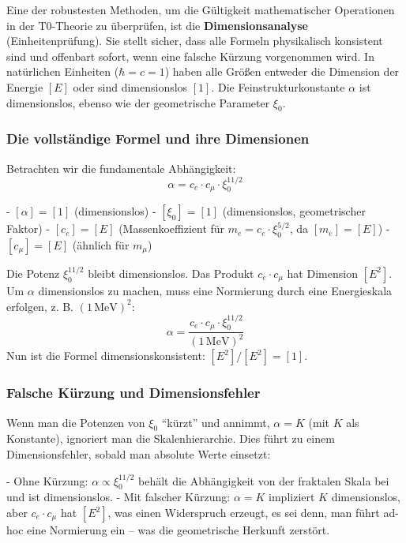 \documentclass[12pt,a4paper]{article}
\newcommand{\xipar}{\xi_0}
\begin{document}
	Eine der robustesten Methoden, um die Gültigkeit mathematischer Operationen in der T0-Theorie zu überprüfen, ist die \textbf{Dimensionsanalyse} (Einheitenprüfung). Sie stellt sicher, dass alle Formeln physikalisch konsistent sind und offenbart sofort, wenn eine falsche Kürzung vorgenommen wird. In natürlichen Einheiten ($\hbar = c = 1$) haben alle Größen entweder die Dimension der Energie $[E]$ oder sind dimensionslos $[1]$. Die Feinstrukturkonstante $\alpha$ ist dimensionslos, ebenso wie der geometrische Parameter $\xipar$.
	
	\subsubsection{Die vollständige Formel und ihre Dimensionen}
	
	Betrachten wir die fundamentale Abhängigkeit:
	\begin{equation}
		\alpha = c_e \cdot c_\mu \cdot \xipar^{11/2}
		\label{eq:full_with_dims}
	\end{equation}
	
	- $[\alpha] = [1]$ (dimensionslos)
	- $[\xipar] = [1]$ (dimensionslos, geometrischer Faktor)
	- $[c_e] = [E]$ (Massenkoeffizient für $m_e = c_e \cdot \xipar^{5/2}$, da $[m_e] = [E]$)
	- $[c_\mu] = [E]$ (ähnlich für $m_\mu$)
	
	Die Potenz $\xipar^{11/2}$ bleibt dimensionslos. Das Produkt $c_e \cdot c_\mu$ hat Dimension $[E^2]$. Um $\alpha$ dimensionslos zu machen, muss eine Normierung durch eine Energieskala erfolgen, z. B. $(1\,\text{MeV})^2$:
	\begin{equation}
		\alpha = \frac{c_e \cdot c_\mu \cdot \xipar^{11/2}}{(1\,\text{MeV})^2}
	\end{equation}
	Nun ist die Formel dimensionskonsistent: $[E^2] / [E^2] = [1]$.
	
	\subsubsection{Falsche Kürzung und Dimensionsfehler}
	
	Wenn man die Potenzen von $\xipar$ ``kürzt'' und annimmt, $\alpha = K$ (mit $K$ als Konstante), ignoriert man die Skalenhierarchie. Dies führt zu einem Dimensionsfehler, sobald man absolute Werte einsetzt:
	
	- Ohne Kürzung: $\alpha \propto \xipar^{11/2}$ behält die Abhängigkeit von der fraktalen Skala bei und ist dimensionslos.
	- Mit falscher Kürzung: $\alpha = K$ impliziert $K$ dimensionslos, aber $c_e \cdot c_\mu$ hat $[E^2]$, was einen Widerspruch erzeugt, es sei denn, man führt ad-hoc eine Normierung ein – was die geometrische Herkunft zerstört.
	
\end{document}
